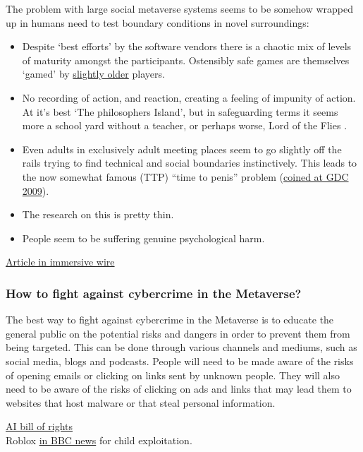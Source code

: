 The problem with large social metaverse systems seems to be somehow wrapped up in humans need to test boundary conditions in novel surroundings:
\begin{itemize}
\item Despite `best efforts' by the software vendors  there is a chaotic mix of levels of maturity amongst the participants. Ostensibly safe games are themselves `gamed' by \href{https://futurism.com/mom-horrified-her-kids-seeing-roblox}{slightly older} players.
\item No recording of action, and reaction, creating a feeling of impunity of action. At it's best `The philosophers Island', but in safeguarding terms it seems more a school yard without a teacher, or perhaps worse, Lord of the Flies \cite{cameron2012splendid}.
\item Even adults in exclusively adult meeting places seem to go slightly off the rails trying to find technical and social boundaries instinctively. This leads to the now somewhat famous (TTP) ``time to penis'' problem \cite{lamb2022second} (\href{http://gamedesignreviews.com/reviews/little-big-planet-browsing-content/}{coined at GDC 2009}). 
\item The research on this is pretty thin.
\item People seem to be suffering genuine psychological harm.
\end{itemize}
\href{https://www.immersivewire.com/p/harassment-metaverse-how-address}{Article in immersive wire}
\subsubsection{How to fight against cybercrime in the Metaverse?}
The best way to fight against cybercrime in the Metaverse is to educate the general public on the potential risks and dangers in order to prevent them from being targeted. This can be done through various channels and mediums, such as social media, blogs and podcasts. People will need to be made aware of the risks of opening emails or clicking on links sent by unknown people. They will also need to be aware of the risks of clicking on ads and links that may lead them to websites that host malware or that steal personal information.

\href{https://www.whitehouse.gov/ostp/ai-bill-of-rights/}{AI bill of rights}\\

Roblox \href{https://www.bbc.co.uk/news/technology-48450604}{in BBC news} for child exploitation.

